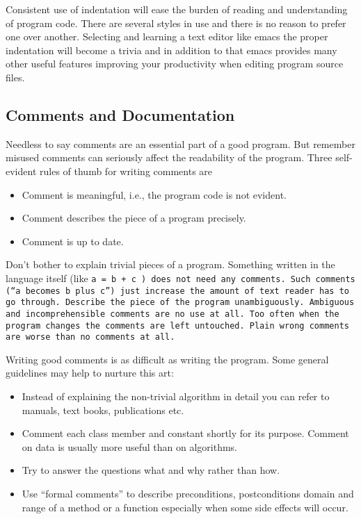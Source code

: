 Consistent  use of  indentation will  ease the  burden of  reading and
understanding of  program code.  There  are several styles in  use and
there is no reason to  prefer one over another. Selecting and learning
a text editor  like emacs the proper indentation  will become a trivia
and  in addition  to that  emacs provides  many other  useful features
improving your productivity when editing program source files.

\subsection{Comments and Documentation}
Needless to say  comments are an essential part of  a good program. But
remember misused comments can  seriously affect the readability of the
program. Three self-evident rules of thumb for writing comments are

\begin{itemize}
  \item Comment is meaningful, i.e., the program code is not evident.
  \item Comment describes the piece of a program precisely.
  \item Comment is up to date. 
\end{itemize}
   
Don't bother to explain trivial pieces of a program. Something written
in the  language itself (like  \tt a =  b + c  \rm) does not  need any
comments. Such  comments (``a  becomes b plus  c'') just  increase the
amount of  text reader has to  go through.  Describe the  piece of the
program unambiguously. Ambiguous  and incomprehensible comments are no
use at all.  Too often when the program changes  the comments are left
untouched. Plain wrong comments are worse than no comments at all. 

Writing good comments is as difficult as writing the program. Some
general guidelines may help to nurture this art:

\begin{itemize}
  \item Instead of explaining  the non-trivial algorithm in detail you
        can  refer  to  manuals,  text books,  publications  etc.
  \item Comment each class member and constant shortly for its
        purpose.  Comment on data is usually more useful than on algorithms.
  \item Try to answer the questions what and why rather than how. 
  \item Use ``formal comments'' to describe preconditions, postconditions 
        domain and range of a method or a function especially when
        some side effects will occur.
\end{itemize}
     

